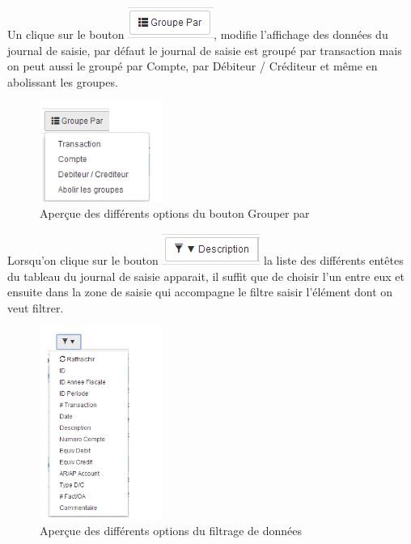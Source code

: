 \documentclass[12pt,a4paper]{report}
\begin{document}
Un clique sur le bouton 
\includegraphics[scale=0.7]{pic/GroupePar.png}, modifie l'affichage des données du journal de saisie, par défaut le journal de saisie est groupé par transaction mais on peut aussi le groupé par Compte, par Débiteur / Créditeur et même en abolissant les groupes.

\begin{figure}[h]
\begin{center}
\includegraphics[width=4cm]{pic/GroupeParAction.png}
\end{center}
\caption{Aperçue des différents options du bouton Grouper par}
\label{Aperçue des différents options du bouton Grouper par}
\end{figure}

Lorsqu'on clique sur le bouton  \includegraphics[scale=0.7]{pic/FiltrageData.png}  la liste des différents entêtes du tableau du journal de saisie apparait, il suffit que de choisir l'un entre eux et ensuite dans la zone de saisie qui accompagne le filtre saisir l'élément dont on veut filtrer.

\begin{figure}[h]
\begin{center}
\includegraphics[width=4cm]{pic/Menufiltrage.png}
\end{center}
\caption{Aperçue des différents options du filtrage de données}
\label{Aperçue des différents options du filtrage de données}
\end{figure}
\end{document}
